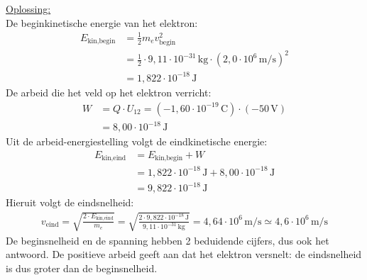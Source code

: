 \documentclass{ximera}
\begin{document}
\begin{exercise}
\begin{solution}
        \underline{Oplossing:}\\
        De beginkinetische energie van het elektron:
        \begin{align*}
            E_{\text{kin,begin}} &= \tfrac{1}{2} m_{e} v_{\text{begin}}^{2} \\
            &= \tfrac{1}{2} \cdot 9{,}11 \cdot 10^{-31} \, \mathrm{kg} \cdot (2{,}0 \cdot 10^{6} \, \mathrm{m/s})^{2} \\
            &= 1{,}822 \cdot 10^{-18} \, \mathrm{J}
        \end{align*}
        De arbeid die het veld op het elektron verricht:
        \begin{align*}
            W &= Q \cdot U_{12} = (-1{,}60 \cdot 10^{-19} \, \mathrm{C}) \cdot (-50 \, \mathrm{V}) \\
            &= 8{,}00 \cdot 10^{-18} \, \mathrm{J}
        \end{align*}
        Uit de arbeid-energiestelling volgt de eindkinetische energie:
        \begin{align*}
            E_{\text{kin,eind}} &= E_{\text{kin,begin}} + W \\
            &= 1{,}822 \cdot 10^{-18} \, \mathrm{J} + 8{,}00 \cdot 10^{-18} \, \mathrm{J} \\
            &= 9{,}822 \cdot 10^{-18} \, \mathrm{J}
        \end{align*}
        Hieruit volgt de eindsnelheid:
        \begin{align*}
            v_{\text{eind}} = \sqrt{\frac{2 \cdot E_{\text{kin,eind}}}{m_{e}}} = \sqrt{\frac{2 \cdot 9{,}822 \cdot 10^{-18} \, \mathrm{J}}{9{,}11 \cdot 10^{-31} \, \mathrm{kg}}} = 4{,}64 \cdot 10^{6} \, \mathrm{m/s} \simeq \boxed{4{,}6 \cdot 10^{6} \, \mathrm{m/s}}
        \end{align*}
        De beginsnelheid en de spanning hebben 2 beduidende cijfers, dus ook het antwoord. De positieve arbeid geeft aan dat het elektron versnelt: de eindsnelheid is dus groter dan de beginsnelheid.
    \end{solution}
\end{exercise}
\end{document}
